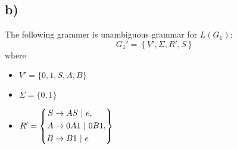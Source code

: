 \subsection*{b)}


The following grammer is unambiguous grammar for $L(G_1)$:
\begin{equation*}
  G_1' = \left\{ V', \Sigma, R', S \right\}
\end{equation*}
where
\begin{itemize}
  \item $V' = \{ 0, 1, S, A, B \}$
  \item $\Sigma = \{ 0, 1 \}$
  \item $R' = \left\{  
    \begin{aligned}
      S &\rightarrow AS\ |\ e, \\
      A &\rightarrow 0A1\ |\ 0B1, \\
      B &\rightarrow B1\ |\ e
    \end{aligned} 
  \right\}$
\end{itemize}
